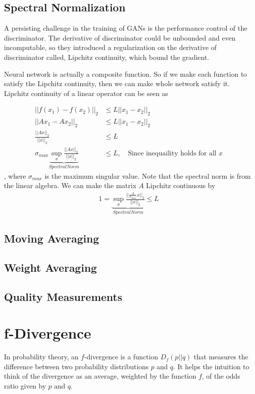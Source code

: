 \begin{appendices}
\subsection{Spectral Normalization}

A persisting challenge in the training of GANs is the performance control of the discriminator. The derivative of discriminator could be unbounded and even incomputable, so they introduced a regularization on the derivative of discriminator called, Lipchitz continuity, which bound the gradient.

Neural network is actually a composite function. So if we make each function to satisfy the Lipchitz continuity, then we can make whole network satisfy it. Lipchitz continuity of a linear operator can be seen as 

\begin{align*}
	||f(x_1)-f(x_2)||_2 &\leq L||x_1-x_2||_2\\
	||Ax_1-Ax_2||_2 &\leq L||x_1-x_2||_2\\
	\frac{||Ax||_2}{||x||_2}&\leq L\\
	\sigma_{max}\underbrace{\sup_x \frac{||Ax||_2}{||x||_2}}_{Spectral Norm}&\leq L, \quad \textrm{Since inequaility holds for all }x
\end{align*}
, where $\sigma_{max}$ is the maximum singular value. Note that the spectral norm is from the linear algebra. We can make the matrix $A$ Lipchitz continuous by 
\begin{align*}
1 = \underbrace{\sup_x \frac{||\frac{A}{\sigma_{max}}x||_2}{||x||_2}}_{Spectral Norm}\leq L
\end{align*}


\subsection{Moving Averaging}

\subsection{Weight Averaging}

\subsection{Quality Measurements}

\section{f-Divergence}
In probability theory, an $f$-divergence is a function $D_{f}(p||q)$ that measures the difference between two probability distributions $p$ and $q$. It helps the intuition to think of the divergence as an average, weighted by the function $f$, of the odds ratio given by $p$ and $q$.


\end{appendices}
